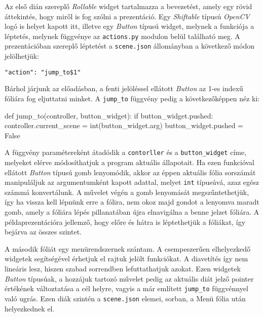 Az első dián szereplő \textit{Rollable} widget tartalmazza a bevezetést, amely egy rövid áttekintés, hogy miről is fog szólni a prezentáció. Egy \textit{Shiftable} típusú \textit{OpenCV} logó is helyet kapott itt, illetve egy \textit{Button} típusú widget, melynek a funkciója a léptetés, melynek függvénye az \texttt{actions.py} modulon belül található meg. A prezentációban szereplő léptetést a \texttt{scene.json} állományban a következő módon jelölhetjük:
\begin{verbatim}
"action": "jump_to$1"
\end{verbatim}
Bárhol járjunk az előadásban, a fenti jelöléssel ellátott \textit{Button} az 1-es indexű fóliára fog eljuttatni minket. A \texttt{jump\_to} függvény pedig a következőképpen néz ki:
\begin{python}
def jump_to(controller, button_widget):
    if button_widget.pushed:
        controller.current_scene = int(button_widget.arg)
        button_widget.pushed = False
\end{python}
A függvény paramétereként átadódik a \texttt{contorller} és a \texttt{button\_widget} címe, melyeket elérve módosíthatjuk a program aktuális állapotait. Ha ezen funkcióval ellátott \textit{Button} típusú gomb lenyomódik, akkor az éppen aktuális fólia sorszámát manipuláljuk az argumentumként kapott adattal, melyet \texttt{int} típusúvá, azaz egész számmá konvertálunk. A művelet végén a gomb lenyomását megszűntethetjük, így ha vissza kell lépnünk erre a fólira, nem okoz majd gondot a lenyomva maradt gomb, amely a fóliára lépés pillanatában újra elnavigálna a benne jelzet fóliára.
A példaprezentációra jellemző, hogy előre és hátra is léptethetjük a fóliákat, így bejárva az összes szintet.

A második fóliát egy menürendszernek szántam. A csempeszerűen elhelyezkedő widgetek segítségével érhetjuk el rajtuk jelölt funkciókat. A diavetítés így nem lineáris lesz, hiszen szabad sorrendben lefuttathatjuk azokat. Ezen widgetek \textit{Button} típusúak, a hozzájuk tartozó művelet pedig az aktuális diát jelző pointer értékének változtatása a cél helyre, vagyis a már említett \texttt{jump\_to} függvénnyel való ugrás. Ezen diák szintén a \texttt{scene.json} elemei, sorban, a Menü fólia után helyezkednek el.

